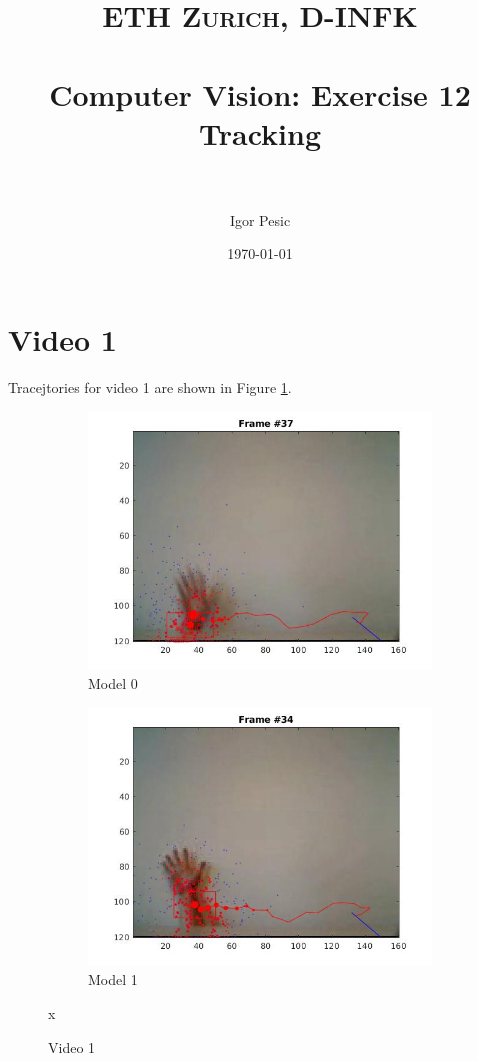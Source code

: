 \documentclass[paper=a4, fontsize=11pt]{scrartcl} %
\title{	
\normalfont \normalsize 
\textsc{ETH Zurich, D-INFK} \\ [25pt] %
\horrule{0.5pt} \\[0.4cm] %
\huge Computer Vision: Exercise 12 Tracking \\ %
\horrule{2pt} \\[0.5cm] %
}
\author{Igor Pesic} %
\date{\normalsize\today} %
\numberwithin{equation}{section} %
\numberwithin{figure}{section} %
\numberwithin{table}{section} %
\begin{document}
\maketitle %


\section{Video 1}

Tracejtories for video 1 are shown in Figure \ref{fig:v1}. 

\begin{figure}
\centering
\begin{subfigure}{.5\textwidth}
  \centering
  \includegraphics[width=.9\linewidth]{video10.jpg}
  \caption{Model 0}
\end{subfigure}%
\begin{subfigure}{.5\textwidth}
  \centering
  \includegraphics[width=.9\linewidth]{video11.jpg}
  \caption{Model 1}
\end{subfigure}
\caption{Video 1}
\label{fig:v1}x
\end{figure}
\end{document}
